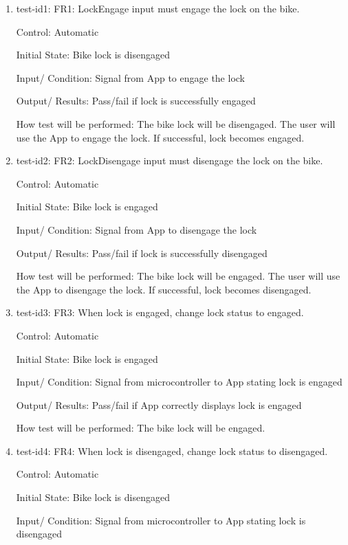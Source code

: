 \documentclass[12pt, titlepage]{article}
\begin{document}
\begin{enumerate}

\item{test-id1: FR1: LockEngage input must engage the lock on the bike. \\} 

Control: Automatic 

Initial State: Bike lock is disengaged 

Input/ Condition: Signal from App to engage the lock 

Output/ Results: Pass/fail if lock is successfully engaged  

How test will be performed: The bike lock will be disengaged. The user will use the App to engage the lock. If successful, lock becomes engaged. 

\item{test-id2: FR2: LockDisengage input must disengage the lock on the bike. \\} 

Control: Automatic 

Initial State: Bike lock is engaged 

Input/ Condition: Signal from App to disengage the lock 

Output/ Results: Pass/fail if lock is successfully disengaged  

How test will be performed: The bike lock will be engaged. The user will use the App to disengage the lock. If successful, lock becomes disengaged. 

\item{test-id3: FR3: When lock is engaged, change lock status to engaged. \\} 

Control: Automatic 

Initial State: Bike lock is engaged 

Input/ Condition: Signal from microcontroller to App stating lock is engaged 

Output/ Results: Pass/fail if App correctly displays lock is engaged 

How test will be performed: The bike lock will be engaged.  

 \item{test-id4: FR4: When lock is disengaged, change lock status to disengaged. \\} 

Control: Automatic 

Initial State: Bike lock is disengaged 

Input/ Condition: Signal from microcontroller to App stating lock is disengaged 


\end{enumerate}
\end{document}
